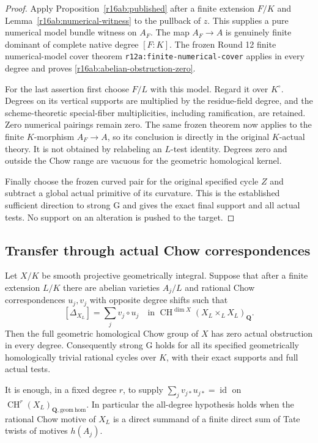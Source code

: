 \begin{proof}
Apply Proposition~\ref{r16ab:published} after a finite extension
$F/K$ and Lemma~\ref{r16ab:numerical-witness} to the pullback of $z$.
This supplies a pure numerical model bundle witness on $A_F$.
The map $A_F\to A$ is genuinely finite dominant of complete
native degree $[F:K]$.  The frozen Round 12 finite numerical-model
cover theorem \texttt{r12a:finite-numerical-cover} applies in every
degree and proves \eqref{r16ab:abelian-obstruction-zero}.

For the last assertion first choose $F/L$ with this model.  Regard
it over $K^\circ$.  Degrees on its vertical supports are multiplied
by the residue-field degree, and the scheme-theoretic special-fiber
multiplicities, including ramification, are retained.  Zero numerical
pairings remain zero.  The same frozen theorem now applies to the
finite $K$-morphism $A_F\to A$, so its conclusion is directly in
the original $K$-actual theory.  It is not obtained by relabeling an
$L$-test identity.  Degrees zero and outside the Chow range are
vacuous for the geometric homological kernel.

Finally choose the frozen curved pair for the original specified
cycle $Z$ and subtract a global actual primitive of its curvature.
This is the established sufficient direction to strong G and gives
the exact final support and all actual tests.  No support on an
alteration is pushed to the target.
\end{proof}

\subsection{Transfer through actual Chow correspondences}

\begin{theorem}
\label{r16ab:motivic}
Let $X/K$ be smooth projective geometrically integral.  Suppose that
after a finite extension $L/K$ there are abelian varieties $A_j/L$
and rational Chow correspondences $u_j,v_j$ with opposite degree
shifts such that
\[
                 [\Delta_{X_L}]=\sum_j v_j\circ u_j
           \quad\text{in }\operatorname{CH}^{\dim X}(X_L\times_LX_L)_{\mathbf Q}.
 \tag{AB16.7}\label{r16ab:chow-factorization}
\]
Then the full geometric homological Chow group of $X$ has zero
actual obstruction in every degree.  Consequently strong G holds
for all its specified geometrically homologically trivial rational
cycles over $K$, with their exact supports and full actual tests.

It is enough, in a fixed degree $r$, to supply
$\sum_jv_{j*}u_{j*}=\operatorname{id}$ on
$\operatorname{CH}^r(X_L)_{\mathbf Q,\mathrm{geom\,hom}}$.
In particular the all-degree hypothesis holds when the rational Chow
motive of $X_L$ is a direct summand of a finite direct sum of Tate
twists of motives $h(A_j)$.
\end{theorem}

